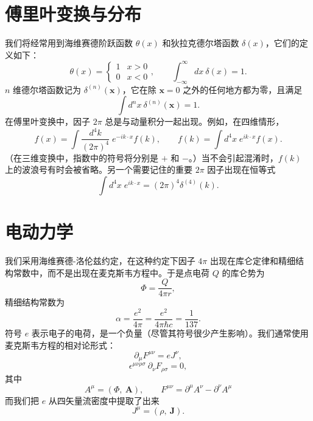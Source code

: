 \section*{傅里叶变换与分布}

我们将经常用到海维赛德阶跃函数 $\theta(x)$ 和狄拉克德尔塔函数 $\delta(x)$，它们的定义如下：
\begin{equation}
  \theta(x) = \begin{cases}1 & x>0\\ 0 & x<0 \end{cases},\qquad
  \int_{-\infty}^{\infty} \!\! dx\ \delta(x) = 1 .
\end{equation}
$n$ 维德尔塔函数记为 $\delta^{(n)}(\mathbf{x})$，它在除 $\mathbf{x}=0$ 之外的任何地方都为零，且满足
\begin{equation}
  \int d^n x\ \delta^{(n)}(\mathbf{x}) = 1 .
\end{equation}
在傅里叶变换中，因子 $2\pi$ 总是与动量积分一起出现。例如，在四维情形，
\begin{equation}
  f(x) = \int \frac{d^4k}{(2\pi)^4}\; e^{-ik\cdot x} f(k),\qquad
  f(k) = \int d^4x\; e^{ik\cdot x} f(x) .
\end{equation}
（在三维变换中，指数中的符号将分别是 $+$ 和 $-$。）当不会引起混淆时，$f(k)$ 上的波浪号有时会被省略。另一个需要记住的重要 $2\pi$ 因子出现在恒等式
\begin{equation}
  \int d^4x\; e^{ik\cdot x} = (2\pi)^4 \delta^{(4)}(k) .
\end{equation}

\section*{电动力学}

我们采用海维赛德-洛伦兹约定，在这种约定下因子 $4\pi$ 出现在库仑定律和精细结构常数中，而不是出现在麦克斯韦方程中。于是点电荷 $Q$ 的库仑势为
\begin{equation}
  \Phi = \frac{Q}{4\pi r} ,
\end{equation}
精细结构常数为
\begin{equation}
  \alpha = \frac{e^2}{4\pi} = \frac{e^2}{4\pi \hbar c} = \frac{1}{137} .
\end{equation}
符号 $e$ 表示电子的电荷，是一个负量（尽管其符号很少产生影响）。我们通常使用麦克斯韦方程的相对论形式：
\begin{equation}
  \partial_\mu F^{\mu\nu} = e J^\nu ,
\end{equation}
\begin{equation}
  \epsilon^{\mu\nu\rho\sigma}\ \partial_\nu F_{\rho\sigma} = 0 ,
\end{equation}
其中
\begin{equation}
  A^\mu = (\Phi,\ \mathbf{A}),\qquad
  F^{\mu\nu} = \partial^\mu A^\nu - \partial^\nu A^\mu
\end{equation}
而我们把 $e$ 从四矢量流密度中提取了出来
\begin{equation}
  J^\mu = (\rho,\ \mathbf{J}) .
\end{equation}

